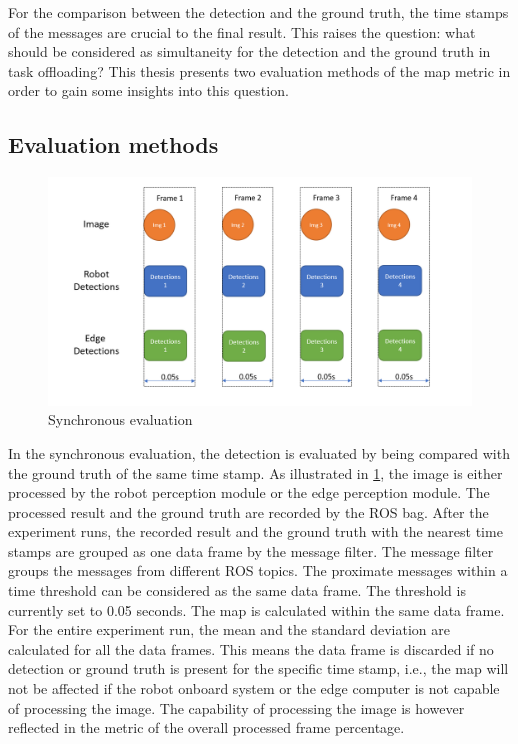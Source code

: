 For the comparison between the detection and the ground truth, the time stamps of the messages are crucial to the final result. This raises the question: what should be considered as simultaneity for the detection and the ground truth in task offloading? This thesis presents two evaluation methods of the \gls{map} metric in order to gain some insights into this question. 

\subsection{Evaluation methods}

\begin{figure}[htp]
    \centering
    \includegraphics[width=\linewidth]{figures/setup/sync_eval.png}
    \caption{Synchronous evaluation}
    \label{fig:sync_eval}
\end{figure}

In the synchronous evaluation, the detection is evaluated by being compared with the ground truth of the same time stamp. As illustrated in \cref{fig:sync_eval}, the image is either processed by the robot perception module or the edge perception module. The processed result and the ground truth are recorded by the ROS bag. After the experiment runs, the recorded result and the ground truth with the nearest time stamps are grouped as one data frame by the message filter. The message filter groups the messages from different ROS topics. The proximate messages within a time threshold can be considered as the same data frame. The threshold is currently set to 0.05 seconds. The \gls{map} is calculated within the same data frame. For the entire experiment run, the mean and the standard deviation are calculated for all the data frames. This means the data frame is discarded if no detection or ground truth is present for the specific time stamp, i.e., the \gls{map} will not be affected if the robot onboard system or the edge computer is not capable of processing the image. The capability of processing the image is however reflected in the metric of the overall processed frame percentage. 

